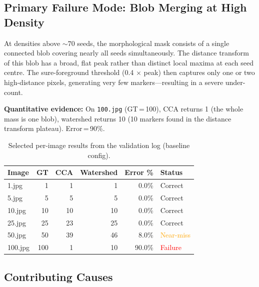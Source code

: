 \documentclass[12pt,a4paper]{article}
\begin{document}
\subsection{Primary Failure Mode: Blob Merging at High Density}

At densities above $\sim\!70$ seeds, the morphological mask consists of a
single connected blob covering nearly all seeds simultaneously. The distance
transform of this blob has a broad, flat peak rather than distinct local
maxima at each seed centre. The sure-foreground threshold (0.4 $\times$ peak)
then captures only one or two high-distance pixels, generating very few
markers—resulting in a severe under-count.

\textbf{Quantitative evidence:} On \texttt{100.jpg} (GT\,=\,100), CCA
returns 1 (the whole mass is one blob), watershed returns 10 (10 markers
found in the distance transform plateau). Error\,=\,90\%.

\begin{table}[H]
\centering
\caption{Selected per-image results from the validation log (baseline config).}
\renewcommand{\arraystretch}{1.2}
\begin{tabular}{l r r r r l}
\toprule
\textbf{Image} & \textbf{GT} & \textbf{CCA} & \textbf{Watershed} & \textbf{Error \%} & \textbf{Status} \\
\midrule
1.jpg   & 1   & 1  & 1  & 0.0\%  & \textcolor{green!60!black}{Correct} \\
5.jpg   & 5   & 5  & 5  & 0.0\%  & \textcolor{green!60!black}{Correct} \\
10.jpg  & 10  & 10 & 10 & 0.0\%  & \textcolor{green!60!black}{Correct} \\
25.jpg  & 25  & 23 & 25 & 0.0\%  & \textcolor{green!60!black}{Correct} \\
50.jpg  & 50  & 39 & 46 & 8.0\%  & \textcolor{orange}{Near-miss} \\
100.jpg & 100 & 1  & 10 & 90.0\% & \textcolor{red}{Failure} \\
\bottomrule
\end{tabular}
\end{table}

\subsection{Contributing Causes}
\end{document}
